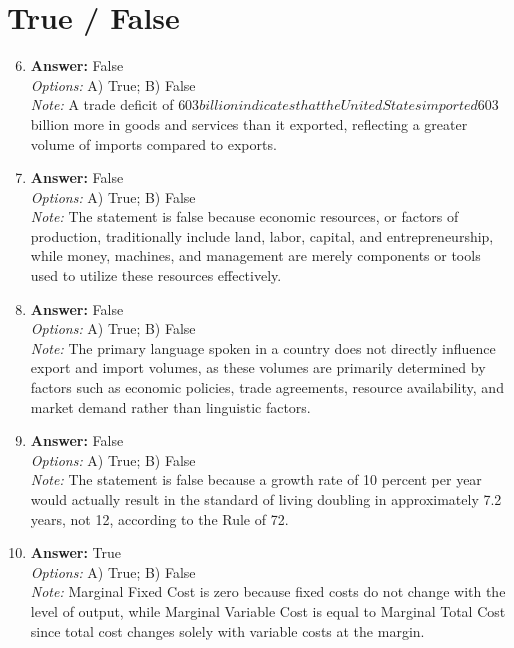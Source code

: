 \documentclass[12pt]{article}
\begin{document}
\section*{True / False}
\begin{enumerate}[label=\arabic*.]
\setcounter{enumi}{5}
\item \textbf{Answer:} False
\\ \textit{Options:} A) True; B) False
\\ \textit{Note:} A trade deficit of $603 billion indicates that the United States imported $603 billion more in goods and services than it exported, reflecting a greater volume of imports compared to exports.
\item \textbf{Answer:} False
\\ \textit{Options:} A) True; B) False
\\ \textit{Note:} The statement is false because economic resources, or factors of production, traditionally include land, labor, capital, and entrepreneurship, while money, machines, and management are merely components or tools used to utilize these resources effectively.
\item \textbf{Answer:} False
\\ \textit{Options:} A) True; B) False
\\ \textit{Note:} The primary language spoken in a country does not directly influence export and import volumes, as these volumes are primarily determined by factors such as economic policies, trade agreements, resource availability, and market demand rather than linguistic factors.
\item \textbf{Answer:} False
\\ \textit{Options:} A) True; B) False
\\ \textit{Note:} The statement is false because a growth rate of 10 percent per year would actually result in the standard of living doubling in approximately 7.2 years, not 12, according to the Rule of 72.
\item \textbf{Answer:} True
\\ \textit{Options:} A) True; B) False
\\ \textit{Note:} Marginal Fixed Cost is zero because fixed costs do not change with the level of output, while Marginal Variable Cost is equal to Marginal Total Cost since total cost changes solely with variable costs at the margin.
\end{enumerate}
\end{document}
